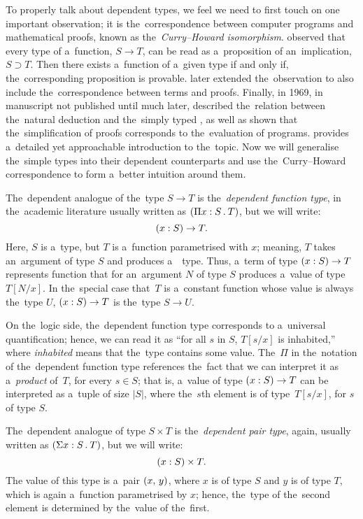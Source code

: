 To properly talk about dependent types, we feel we need to first touch on one
important observation; it is the~correspondence between computer programs and
mathematical proofs, known as the~\emph{Curry–Howard isomorphism}.
\citet{curry_1934} observed that every type of a~function, $S \to T$,
can be read as a~proposition of an~implication, $S \supset T$. Then there exists
a~function of a~given type if and only if, the~corresponding proposition is
provable. \citet{curry_1958} later extended the~observation to also include
the~correspondence between terms and proofs. Finally, in 1969, in manuscript not
published until much later, \citet{howard_1980} described the~relation between
the~natural deduction and the~simply typed \lc, as well as shown that
the~simplification of proofs corresponds to the~evaluation of programs.
\citet{wadler_2015} provides a~detailed yet approachable introduction to
the~topic. Now we will generalise the~simple types into their dependent
counterparts and use the~Curry–Howard correspondence to form a~better intuition
around them.

The~dependent analogue of the~type $S \to T$ is the~\emph{dependent
function type}, in the~academic literature usually written as ${(\Pi x \overset{}:
S \, . \: T)}$, but we will write:
\[
  (x : S) \to T.
\]
Here, $S$ is a~type, but $T$ is a~function parametrised with $x$; meaning, $T$
takes an~argument of type $S$ and produces a~~type. Thus, a~term of type
$(x : S) \to T$ represents function that for an~argument $N$ of type $S$ produces
a~value of type \,$T[N/x]$. In the~special case that \,$T$ is a~constant
function whose value is always the~type $U$, $(x : S) \to T$ is the~type $S \to U$.

On the~logic side, the~dependent function type corresponds to a~universal
quantification; hence, we can read it as ``for all $s$ in $S$, $T[s/x]$ is
inhabited,'' where \emph{inhabited} means that the~type contains some value.
The~$\Pi$ in the~notation of the~dependent function type references the~fact
that we can interpret it as a~\emph{product} of \,$T$, for every $s \in S$; that
is, a~value of type $(x : S) \to T$ can be interpreted as a~tuple of size $|S|$,
where the~$s$th element is of type \,$T[s/x]$, for $s$ of type $S$.

The~dependent analogue of type $S \times T$ is the~\emph{dependent pair type},
again, usually written as ${(\Sigma x \overset{}: S \, . \: T)}$, but we will write:
\[
  (x \overset{}: S) \times T.
\]
The value of this type is a~pair $(x, \, y)$, where $x$ is of type $S$ and $y$
is of type $T$, which is again a~function parametrised by $x$; hence, the~type
of the~second element is determined by the~value of the~first.

